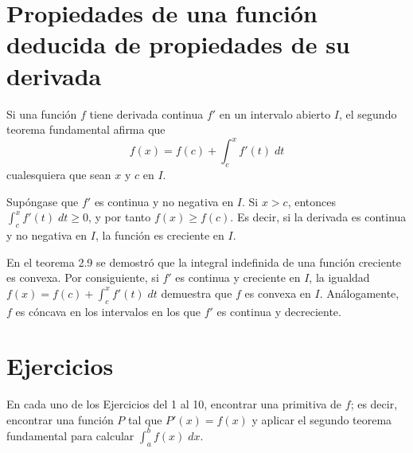 \section{Propiedades de una función deducida de propiedades de su derivada}
Si una función $f$ tiene derivada continua $f'$ en un intervalo abierto $I$, el segundo teorema fundamental afirma que 
$$f(x)=f(c)+\int_c^x f'(t)\; dt$$
cualesquiera que sean $x$ y $c$ en $I$. \\

\begin{prop}
Supóngase que $f'$ es continua y no negativa en $I$. Si $x>c$, entonces $\int_c^x f'(t)\; dt \geq 0$, y por tanto $f(x)\geq f(c)$. Es decir, si la derivada es continua y no negativa en $I$, la función es creciente en $I$.
\end{prop}

En el teorema 2.9 se demostró que la integral indefinida de una función creciente es convexa. Por consiguiente, si $f'$ es continua y creciente en $I$, la igualdad $f(x)=f(c)+\int_c^x f'(t)\; dt$ demuestra que $f$ es convexa en $I$. Análogamente, $f$ es cóncava en los intervalos en los que $f'$ es continua y decreciente.


\section{Ejercicios}

En cada uno de los Ejercicios del 1 al 10, encontrar una primitiva de $f$; es decir, encontrar una función $P$ tal que $P'(x)=f(x)$ y aplicar el segundo teorema fundamental para calcular $\int_a^b f(x)\; dx.$\\

